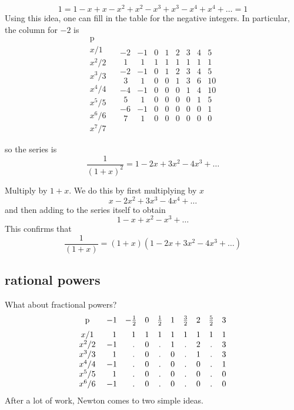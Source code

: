 \documentclass[11pt, oneside]{article}
\begin{document}
\[ 1 = 1 - x + x - x^2 + x^2 - x^3 + x^3 - x^4 + x^4 + \dots  = 1 \]
Using this idea, one can fill in the table for the negative integers.  In particular, the column for $-2$ is
\[
\begin{matrix}
\text{p}  \\
x/1  \\
x^2/2 \\
x^3/3 \\
x^4/4 \\
x^5/5 \\
x^6/6 \\
x^7/7
\end{matrix} \ \ \ \
\begin{matrix}
 -2 & -1 & 0 & 1 & 2 & 3 & 4 & 5  \\
\ \ 1 & \ \ 1 & 1 & 1 & 1 & 1 & 1 & 1  \\
-2 & -1 & 0 & 1 & 2 & 3 & 4 & 5 \\
\ \ 3 & \ \ 1 & 0 & 0 & 1 & 3 & 6 & 10 \\
-4 & -1 & 0 & 0 & 0 & 1 & 4 & 10 \\
\ \ 5 & \ \ 1 & 0 & 0 & 0 & 0 & 1 & 5 \\
-6 & -1 & 0 & 0 & 0 & 0 & 0 & 1 \\
\ \ 7 & \ \ 1 & 0 & 0 & 0 & 0 & 0 & 0
\end{matrix}
\]

so the series is
\[ \frac{1}{(1 + x)^2} = 1 - 2x + 3x^2 - 4x^3 + \dots \]

Multiply by $1 + x$.  We do this by first multiplying by $x$
\[ x - 2x^2 + 3x^3 - 4x^4 + \dots \]
and then adding to the series itself to obtain
\[ 1 - x + x^2 - x^3 + \dots \]
This confirms that
\[ \frac{1}{(1 + x)} = (1 + x) (1 - 2x + 3x^2 - 4x^3 + \dots) \]

\subsection*{rational powers}
What about fractional powers?
\[
\begin{matrix}
\text{p}  \vspace{2 mm} \\
x/1  \\
x^2/2 \\
x^3/3 \\
x^4/4 \\
x^5/5 \\
x^6/6
\end{matrix} \ \ \ \
\begin{matrix}
-1 & -\frac{1}{2} & 0& \frac{1}{2} & 1& \frac{3}{2}  & 2 & \frac{5}{2}  & 3   \vspace{2 mm}  \\
\ \ 1 & \ \ 1 & 1 & 1 & 1 & 1 & 1 & 1 & 1 \\
-1 & \ \ . & 0 & . & 1 & . & 2 & . & 3 \\
\ \ 1 & \ \ . & 0 & . & 0 & . & 1 & . & 3 \\
-1 &  \ \ .  & 0 & . & 0 & . & 0 & . & 1 \\
\ \ 1 &  \ \ . & 0 & . & 0 & . & 0 & . & 0 \\
-1 &   \ \  . & 0 & . & 0 & . & 0 & . & 0 \\
\end{matrix}
\]
After a lot of work, Newton comes to two simple ideas.  
\end{document}
